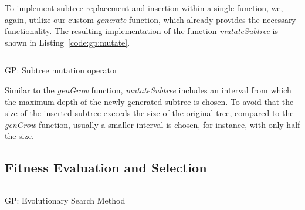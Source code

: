 To implement subtree replacement and insertion within a single function, we, again, utilize our custom \emph{generate} function, which already provides the necessary functionality.
The resulting implementation of the function \emph{mutateSubtree} is shown in Listing~\ref{code:gp:mutate}.
\begin{listing}[!htb]
	\inputminted{python}{evostencils/gp/mutate.py}
	\caption{GP: Subtree mutation operator}
	\label{code:gp:mutate}
\end{listing}
Similar to the \emph{genGrow} function, \emph{mutateSubtree} includes an interval from which the maximum depth of the newly generated subtree is chosen.
To avoid that the size of the inserted subtree exceeds the size of the original tree, compared to the \emph{genGrow} function, usually a smaller interval is chosen, for instance, with only half the size.

\subsection{Fitness Evaluation and Selection}

\begin{listing}
	\inputminted[linenos]{python}{evostencils/optimization/evolutionary_search.py}
	\caption{GP: Evolutionary Search Method}
	\label{code:gp:evolutionary_search}
\end{listing}

